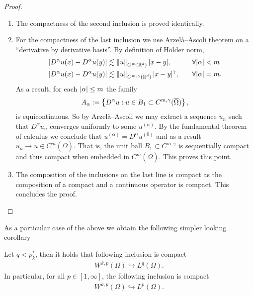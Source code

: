 \documentclass[
    a4paper,
    DIV=14,
    abstract=true,
    numbers=noenddot
]{scrartcl}
\begin{document}
\begin{proof}
\begin{enumerate}
		\item The compactness of the second inclusion is proved identically.
		\item For the compactness of the last inclusion we use \href{https://en.wikipedia.org/wiki/Arzel%C3%A0%E2%80%93Ascoli_theorem#:~:text=%2C%20%C2%A7IV.6.7}{Arzelà–Ascoli theorem} on a ``derivative by derivative basis''. By definition of Hölder norm,
		      \begin{align*}
			      {\left| D^\alpha u(x)- D^\alpha u(y) \right|} & \lesssim  \left\lVert u \right\rVert_{C^{m}(\mathbb{R}^d)}{\left| x-y \right|} ,                 &  & \quad\forall {\left| \alpha \right|}<m  \\
			      {\left| D^\alpha u(x)- D^\alpha u(y) \right|} & \lesssim  \left\lVert u \right\rVert_{C^{m,\gamma }(\mathbb{R}^d)}{\left| x-y \right|}^\gamma  , &  & \quad\forall {\left| \alpha \right|}=m.
		      \end{align*}
		      As a result, for each ${\left| \alpha \right|}\leq m$ the family
		      \begin{align*}
			      A_\alpha:=\left\{D^\alpha u: u \in B_1 \subset C^{m,\gamma }(\overline{\Omega})\right\},
		      \end{align*}
		      is equicontinuous. So by Arzelà–Ascoli we may extract a sequence $u_{n}$ such that $D^\alpha u_n$ converges uniformly to some $u^{(\alpha)}$. By the fundamental theorem of calculus we conclude that $u^{(\alpha)}=D^\alpha u^{(0)}$ and as a result $u_n \to u \in C^m(\overline{\Omega})$. That is, the unit ball $B_1 \subset C^{m,\gamma }$ is sequentially compact and thus compact when embedded in  $C^m(\overline{\Omega})$. This proves this point.

		\item The composition of the inclusions on the last line is compact as the composition of a compact and a continuous operator is compact.    This concludes the proof.
	\end{enumerate}
\end{proof}
As a particular case of the above we obtain the following simpler looking corollary
\begin{corollary}\label{simple embedding}
	Let $q< p_k^*$, then it holds that following inclusion is compact
	\begin{align*}
		W^{k,p}(\Omega) \hookrightarrow L^q(\Omega).
	\end{align*}
	In particular, for all $p \in [1, \infty]$, the following inclusion is compact
	\begin{align*}
		W^{k,p}(\Omega) \hookrightarrow L^p(\Omega).
	\end{align*}
\end{corollary}
\end{document}
